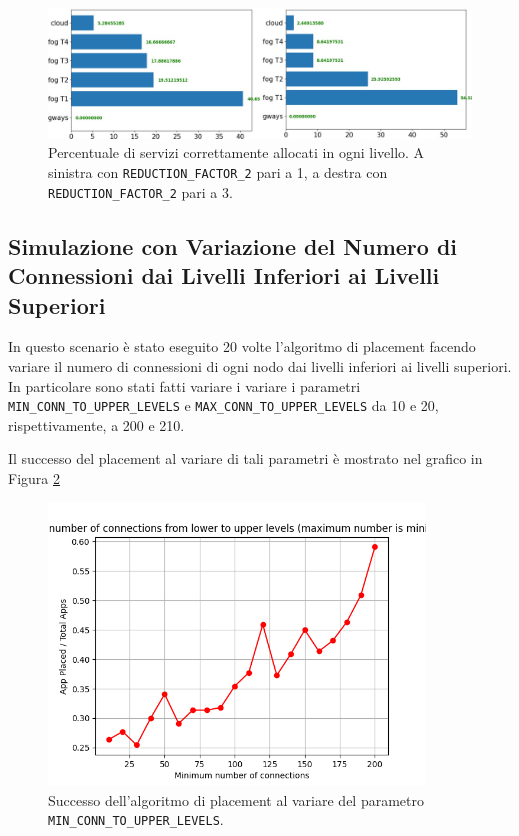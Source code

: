 \begin{figure}[!ht]
  \includegraphics[width=14cm]{images/reduction_factor_placement_comparison}
  \centering
  \caption{Percentuale di servizi correttamente allocati in ogni livello. A sinistra con \texttt{REDUCTION\_FACTOR\_2} pari a 1, a destra con \texttt{REDUCTION\_FACTOR\_2} pari a 3.}
  \label{fig:reduction_factor_placement_comparison}
\end{figure}

\subsection{Simulazione con Variazione del Numero di Connessioni dai Livelli Inferiori ai Livelli Superiori}

In questo scenario è stato eseguito 20 volte l'algoritmo di placement facendo variare il numero di connessioni di ogni nodo dai livelli inferiori ai livelli superiori. In particolare sono stati fatti variare i variare i parametri \texttt{MIN\_CONN\_TO\_UPPER\_LEVELS} e \texttt{MAX\_CONN\_TO\_UPPER\_LEVELS} da 10 e 20, rispettivamente, a 200 e 210.

Il successo del placement al variare di tali parametri è mostrato nel grafico in Figura \ref{fig:minmax_conn_to_upper}

\begin{figure}[!ht]
  \includegraphics[width=10cm]{images/minmax_conn_to_upper}
  \centering
  \caption{Successo dell'algoritmo di placement al variare del parametro \texttt{MIN\_CONN\_TO\_UPPER\_LEVELS}.}
  \label{fig:minmax_conn_to_upper}
\end{figure}

